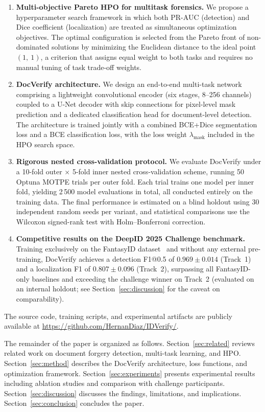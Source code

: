 \begin{enumerate}
  \item \textbf{Multi-objective Pareto HPO for multitask forensics.}
    We propose a hyperparameter search framework in which both PR-AUC (detection)
    and Dice coefficient (localization) are treated as simultaneous optimization
    objectives. The optimal configuration is selected from the Pareto front of
    non-dominated solutions by minimizing the Euclidean distance to the ideal
    point~$(1,~1)$, a criterion that assigns equal weight to both tasks and
    requires no manual tuning of task trade-off weights.

  \item \textbf{DocVerify architecture.}
    We design an end-to-end multi-task network comprising a lightweight
    convolutional encoder (six stages, 8--256 channels) coupled to a U-Net decoder
    with skip connections for pixel-level mask prediction and a dedicated
    classification head for document-level detection. The architecture is trained
    jointly with a combined BCE+Dice segmentation loss and a BCE classification
    loss, with the loss weight $\lambda_{\text{mask}}$ included in the HPO search
    space.

  \item \textbf{Rigorous nested cross-validation protocol.}
    We evaluate DocVerify under a 10-fold outer $\times$ 5-fold inner nested
    cross-validation scheme, running 50 Optuna MOTPE trials per outer fold.
    Each trial trains one model per inner fold, yielding 2\,500 model evaluations
    in total, all conducted entirely on the training data. The final
    performance is estimated on a blind holdout using 30 independent random seeds
    per variant, and statistical comparisons use the Wilcoxon signed-rank test with
    Holm--Bonferroni correction.

  \item \textbf{Competitive results on the DeepID 2025 Challenge benchmark.}
    Training exclusively on the FantasyID dataset~\cite{fantasyid2024} and without
    any external pre-training, DocVerify achieves a detection F1@0.5 of
    $0.969 \pm 0.014$ (Track~1) and a localization F1 of $0.807 \pm 0.096$
    (Track~2), surpassing all FantasyID-only baselines and exceeding the challenge
    winner on Track~2 (evaluated on an internal holdout; see Section~\ref{sec:discussion}
    for the caveat on comparability).
\end{enumerate}

The source code, training scripts, and experimental artifacts are publicly
available at \url{https://github.com/HernanDiaz/IDVerify/}.

The remainder of the paper is organized as follows. Section~\ref{sec:related}
reviews related work on document forgery detection, multi-task learning, and HPO.
Section~\ref{sec:method} describes the DocVerify architecture, loss functions, and
optimization framework. Section~\ref{sec:experiments} presents experimental results
including ablation studies and comparison with challenge participants.
Section~\ref{sec:discussion} discusses the findings, limitations, and implications.
Section~\ref{sec:conclusion} concludes the paper.
